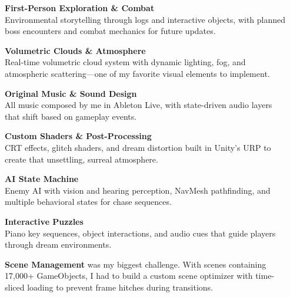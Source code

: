 \documentclass[final]{beamer}
\newlength{\sepwidth}
\newlength{\colwidth}
\newcommand{\separatorcolumn}{\begin{column}{\sepwidth}\end{column}}
\begin{document}
\begin{frame}[t]
\begin{columns}[t]
\separatorcolumn

\begin{column}{\colwidth}

\begin{posterblock}
\large

\textbf{First-Person Exploration \& Combat}\\
Environmental storytelling through logs and interactive objects, with planned boss encounters and combat mechanics for future updates.

\vspace{0.6cm}

\textbf{Volumetric Clouds \& Atmosphere}\\
Real-time volumetric cloud system with dynamic lighting, fog, and atmospheric scattering---one of my favorite visual elements to implement.

\vspace{0.6cm}

\textbf{Original Music \& Sound Design}\\
All music composed by me in Ableton Live, with state-driven audio layers that shift based on gameplay events.

\vspace{0.6cm}

\textbf{Custom Shaders \& Post-Processing}\\
CRT effects, glitch shaders, and dream distortion built in Unity's URP to create that unsettling, surreal atmosphere.

\vspace{0.6cm}

\textbf{AI State Machine}\\
Enemy AI with vision and hearing perception, NavMesh pathfinding, and multiple behavioral states for chase sequences.

\vspace{0.6cm}

\textbf{Interactive Puzzles}\\
Piano key sequences, object interactions, and audio cues that guide players through dream environments.

\end{posterblock}

\vspace{1cm}

\begin{posterblock}
\large
\justifying
\textbf{Scene Management} was my biggest challenge. With scenes containing 17,000+ GameObjects, I had to build a custom scene optimizer with time-sliced loading to prevent frame hitches during transitions.


\end{posterblock}
\end{column}
\end{columns}
\end{frame}
\end{document}
